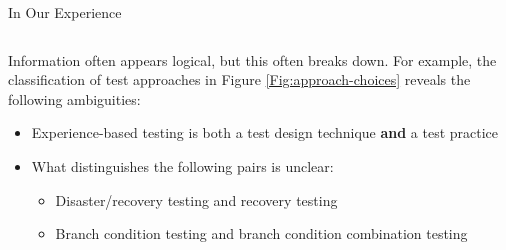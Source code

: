 \documentclass[22pt]{beamer}
\begin{document}
\begin{frame}[fragile]
\begin{textblock}{7.25}
\begin{block}{\fontsize{37}{20}\selectfont In Our Experience}
\begin{columns}
\begin{column}{0.25\textwidth}
                    Information often appears logical, but this often breaks
                    down. For example, the classification of test approaches in
                    Figure \ref{Fig:approach-choices} reveals the following
                    ambiguities:
                    \begin{itemize}
                        \item Experience-based testing is both a test design
                              technique \textbf{and} a test practice
                        \item What distinguishes the following pairs is unclear:
                              \begin{itemize}
                                  \item Disaster/recovery testing and recovery
                                        testing
                                  \item Branch condition testing and branch
                                        condition combination testing
                              \end{itemize}
                    \end{itemize}
                \end{column}
            \end{columns}
        \end{block}
    \end{textblock}


\end{frame}
\end{document}

